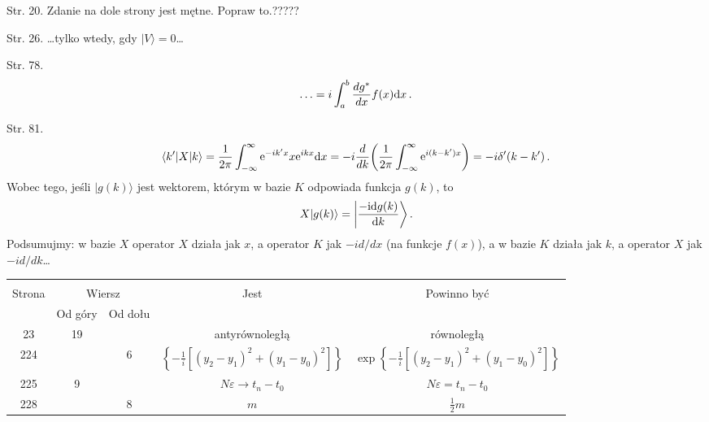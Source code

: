 \documentclass[a4paper,11pt]{article}
\begin{document}
\noindent

Str. 20. Zdanie na dole strony jest mętne. Popraw to.?????

Str. 26. \ldots tylko wtedy, gdy $| V \rangle = 0$\ldots

Str. 78. %
$$\ldots = i \int_{a}^{b} \frac{ dg^{ * } }{ dx } f( x ) \mathrm{d} x \, .$$

Str. 81.
  $$\langle k' | X | k \rangle = \frac{ 1 }{ 2 \pi } \int_{ -\infty
  }^{ \infty } \mathrm{e}^{ -i k' x } x \mathrm{e}^{ i k x } \mathrm{d} x = -i \frac{ d }{ dk } \bigg( \frac{ 1 }{ 2 \pi } \int_{ -\infty }^{ \infty } \mathrm{e}^{ i ( k - k' ) x } \bigg) = -i \delta'( k - k' ) \, .$$ Wobec
  tego, jeśli $| g( k ) \rangle$ jest wektorem, którym w bazie $K$
  odpowiada funkcja $g( k )$, to
$$X| g( k ) \rangle = \bigg| \frac{ -\mathrm{i} \mathrm{d} g( k ) }{ \mathrm{d} k } \bigg\rangle \, .$$
Podsumujmy: w bazie $X$ operator $X$ działa jak $x$, a operator $K$
jak $-i d / d x$ (na funkcje $f( x )$), a w bazie $K$ działa jak
$k$, a operator $X$ jak $-i d / d k$\ldots


\vspace{\spaceTwo}














\begin{center}

  \begin{tabular}{|c|c|c|c|c|}
    \hline
    & \multicolumn{2}{c|}{} & & \\
    Strona & \multicolumn{2}{c|}{Wiersz} & Jest
                              & Powinno być \\ \cline{2-3}
    & Od góry & Od dołu &  &  \\
    \hline
    23 & 19 & & antyrównoległą & równoległą \\
    224 & & 6 & $\left\{ -\frac{ 1 }{ i } [ ( y_{ 2  } - y_{ 1 } )^{ 2 }
                + ( y_{ 1 } - y_{ 0 } )^{ 2 } ] \right\}$
           & $\exp\left\{ -\frac{ 1 }{ i } [ ( y_{ 2  } - y_{ 1 } )^{ 2 }
             + ( y_{ 1 } - y_{ 0 } )^{ 2 } ] \right\}$ \\
    225 & 9 & & $N \varepsilon \to t_{ n } - t_{ 0 }$
           & $N \varepsilon = t_{ n } - t_{ 0 }$ \\
    228 & & 8 & $m$ & $\frac{ 1 }{ 2 } m$ \\
    \hline
  \end{tabular}

\end{center}
\end{document}
